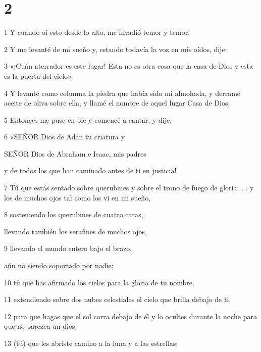 \chapter{2}

\par 1 Y cuando oí esto desde lo alto, me invadió temor y temor.

\par 2 Y me levanté de mi sueño y, estando todavía la voz en mis oídos, dije:

\par 3 «¡Cuán aterrador es este lugar! Esta no es otra cosa que la casa de Dios y esta es la puerta del cielo».

\par 4 Y levanté como columna la piedra que había sido mi almohada, y derramé aceite de oliva sobre ella, y llamé el nombre de aquel lugar Casa de Dios.

\par 5 Entonces me puse en pie y comencé a cantar, y dije:

\par 6 «SEÑOR Dios de Adán tu criatura y
\par SEÑOR Dios de Abraham e Isaac, mis padres
\par y de todos los que han caminado antes de ti en justicia!

\par 7 Tú que estás sentado sobre querubines y sobre el trono de fuego de gloria. . . y los de muchos ojos tal como los vi en mi sueño,

\par 8 sosteniendo los querubines de cuatro caras,
\par llevando también los serafines de muchos ojos,

\par 9 llevando el mundo entero bajo el brazo,
\par aún no siendo soportado por nadie;

\par 10 tú que has afirmado los cielos para la gloria de tu nombre,

\par 11 extendiendo sobre dos nubes celestiales el cielo que brilla debajo de ti,

\par 12 para que hagas que el sol corra debajo de él y lo ocultes durante la noche para que no parezca un dios;

\par 13 (tú) que les abriste camino a la luna y a las estrellas;

